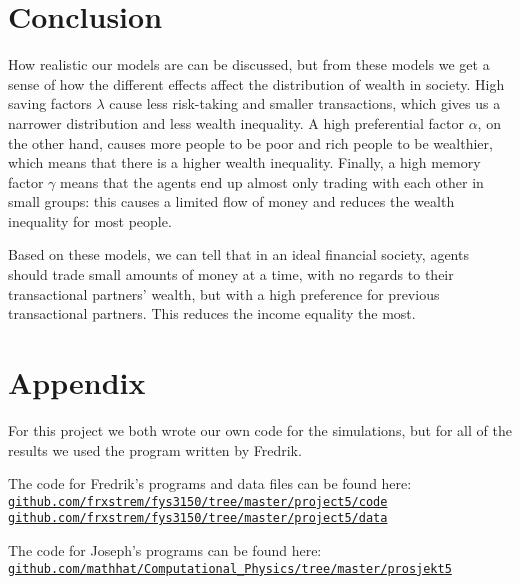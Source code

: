 \documentclass[12pt,a4paper]{article}
\begin{document}
\clearpage
\section{Conclusion}
How realistic our models are can be discussed, but from these models we get a sense of how the different effects affect the distribution of wealth in society. High saving factors $\lambda$ cause less risk-taking and smaller transactions, which gives us a narrower distribution and less wealth inequality. A high preferential factor $\alpha$, on the other hand, causes more people to be poor and rich people to be wealthier, which means that there is a higher wealth inequality. Finally, a high memory factor $\gamma$ means that the agents end up almost only trading with each other in small groups: this causes a limited flow of money and reduces the wealth inequality for most people.

Based on these models, we can tell that in an ideal financial society, agents should trade small amounts of money at a time, with no regards to their transactional partners' wealth, but with a high preference for previous transactional partners. This reduces the income equality the most.

\clearpage

\appendix
\section{Appendix}

For this project we both wrote our own code for the simulations, but for all of the results we used the program written by Fredrik.

The code for Fredrik's programs and data files can be found here: \\
\href{https://github.com/frxstrem/fys3150/tree/master/project5/code}{\tt github.com/frxstrem/fys3150/tree/master/project5/code} \\
\href{https://github.com/frxstrem/fys3150/tree/master/project5/data}{\tt github.com/frxstrem/fys3150/tree/master/project5/data}

The code for Joseph's programs can be found here: \\
\href{https://github.com/mathhat/Computational_Physics/tree/master/prosjekt5}{\tt github.com/mathhat/Computational\_Physics/tree/master/prosjekt5}

\printbibliography[heading=bibnumbered,title=Bibliography]
\end{document}
